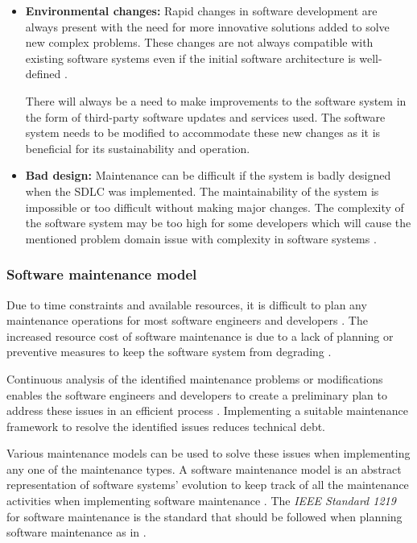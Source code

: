 \begin{itemize}
	\item \textbf{Environmental changes:} Rapid changes in software development are always present with the need for more innovative solutions added to solve new complex problems. These changes are not always compatible with existing software systems even if the initial software architecture is well-defined \cite{Ogheneovo2014}. \par There will always be a need to make improvements to the software system in the form of third-party software updates and services used. The software system needs to be modified to accommodate these new changes as it is beneficial for its sustainability and operation.
	\item \textbf{Bad design:} Maintenance can be difficult if the system is badly designed when the SDLC was implemented. The maintainability of the system is impossible or too difficult without making major changes. The complexity of the software system may be too high for some developers which will cause the mentioned problem domain issue with complexity in software systems \cite{Lenarduzzi2017}.
\end{itemize}

\clearpage

\subsubsection{Software maintenance model}\label{sec:ch1_maintenanceModel}
Due to time constraints and available resources, it is difficult to plan any maintenance operations for most software engineers and developers \cite{DeLeon-Sigg2020}. The increased resource cost of software maintenance is due to a lack of planning or preventive measures to keep the software system from degrading \cite{Alenezi2016}.\par Continuous analysis of the identified maintenance problems or modifications enables the software engineers and developers to create a preliminary plan to address these issues in an efficient process \cite{Port2017}. Implementing a suitable maintenance framework to resolve the identified issues reduces technical debt.\par Various maintenance models can be used to solve these issues when implementing any one of the maintenance types. A software maintenance model is an abstract representation of software systems' evolution to keep track of all the maintenance activities when implementing software maintenance \cite{Ren2011}. The \textit{IEEE Standard 1219} for software maintenance is the standard that should be followed when planning software maintenance as in . 


